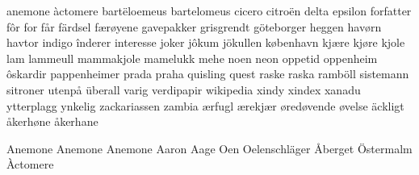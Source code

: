 \documentclass[norsk]{scrartcl}
\begin{document}
anemone
àctomere
bartëloemeus
bartelomeus
cicero
citroën
delta
epsilon
forfatter
fôr
for
får
färdsel
færøyene
gavepakker
grisgrendt
göteborger
heggen
havørn
havtor
indigo
înderer
interesse
joker
jôkum
jökullen
københavn
kjære
kjøre
kjole
lam
lammeull
mammakjole
mamelukk
mehe
noen
neon
oppetid
oppenheim
ôskardir
pappenheimer
prada
praha
quisling
quest
raske
raska
ramböll
sistemann
sitroner
utenpå
überall
varig
verdipapir
wikipedia
xindy
xindex
xanadu
ytterplagg
ynkelig
zackariassen
zambia
ærfugl
ærekjær
øredøvende
øvelse
äckligt
åkerhøne
åkerhane

Anemone
Anemone
Anemone
Aaron
Aage
Oen
Oelenschläger
Åberget
Östermalm
Àctomere


\printindex
\end{document}
